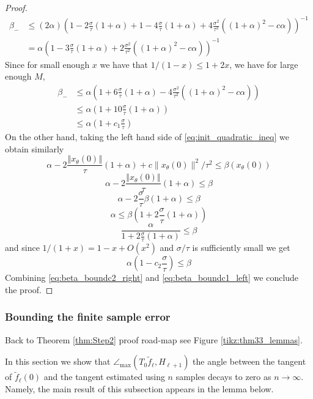 \documentclass[12pt]{article}
\theoremstyle{remark}
\newcommand{\norm}[1]{\left\Vert #1 \right\Vert}
\newcommand{\wtilde}[1]{\widetilde{#1}}
\newcommand{\maxangle}{\angle_{\max}}
\begin{document}
\begin{appendices}
\begin{proof}
\begin{align*}
	\beta_{-} 
	&\leq
(2 \alpha)\left(
  1-2\frac{\sigma}{\tau}(1+\alpha) +1-4\frac{\sigma}{\tau}(1+\alpha) + 4\frac{\sigma^2}{\tau^2}\left((1+\alpha)^2- c\alpha\right) \right)^{-1}
  \\
  &=
 \alpha\left(
  1-3\frac{\sigma}{\tau}(1+\alpha) + 2\frac{\sigma^2}{\tau^2}\left((1+\alpha)^2- c\alpha\right) \right)^{-1}
	\end{align*} 
Since for small enough $x$ we have that $1/(1-x) \leq 1+2x$, we have for large enough $M$,
\begin{align}\label{eq:beta_boundc1_left}
	\beta_{-} 
	&\leq
 \alpha\left(
  1+6\frac{\sigma}{\tau}(1+\alpha) -4\frac{\sigma^2}{\tau^2}\left((1+\alpha)^2- c\alpha\right) \right) \nonumber
  \\
  &\leq
 \alpha\left(
  1+10\frac{\sigma}{\tau}(1+\alpha)  \right) \nonumber\\
  &\leq
 \alpha\left(
  1+c_1\frac{\sigma}{\tau} \right)
	\end{align} 
On the other hand, taking the left hand side of \eqref{eq:init_quadratic_ineq} we obtain similarly
\[
 \alpha- 2\frac{\norm{x_\theta(0)}}{\tau}(1 + \alpha)  +c\|x_\theta(0)\|^2/\tau^2 \leq \beta(x_\theta(0))
\]
\[
 \alpha- 2\frac{\norm{x_\theta(0)}}{\tau}(1 + \alpha)  \leq \beta
\]
\[
 \alpha- 2\frac{\sigma}{\tau}\beta(1 + \alpha)  \leq \beta
\]
\[
 \alpha \leq \beta \left(1+ 2\frac{\sigma}{\tau}(1 + \alpha) \right)
\]
\[
 \frac{\alpha}{1+ 2\frac{\sigma}{\tau}(1 + \alpha) } \leq \beta 
\]
and since $1/(1+x) = 1 - x + O(x^2)$ and $\sigma/\tau$ is sufficiently small we get
\begin{equation}\label{eq:beta_boundc2_right}
 \alpha \left(1- c_2\frac{\sigma}{\tau}\right) \leq \beta 
\end{equation}
Combining \eqref{eq:beta_boundc2_right} and \eqref{eq:beta_boundc1_left} we conclude the proof.
\end{proof}

\subsubsection{Bounding the finite sample error}\label{sec:FiniteSample_err}
Back to Theorem \ref{thm:Step2} proof road-map see Figure \ref{tikz:thm33_lemmas}.

\noindent In this section we show that  $ \maxangle(T_0 \wtilde f_\ell, H_{\ell + 1}) $ the angle between the tangent of $\wtilde{f}_\ell(0)$ and the tangent estimated using $n$ samples decays to zero as $n\to \infty$.
Namely, the main result of this subsection appears in the lemma below.


\end{appendices}
\end{document}
